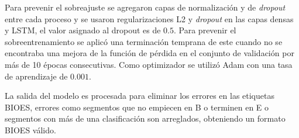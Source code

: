 \documentclass[a4paper,11pt,twocolumn,twoside]{article}
\begin{document}
Para prevenir el sobreajuste se agregaron capas de normalización y de \textit{dropout} entre cada proceso y se usaron regularizaciones
L2 y \textit{dropout} en las capas densas y LSTM, el valor asignado al dropout es de $0.5$. 
Para prevenir el sobreentrenamiento se aplicó una 
terminación temprana de este cuando no se encontraba una mejora de la función de pérdida en el conjunto de validación
por más de 10 épocas consecutivas. Como optimizador se utilizó Adam con una tasa de aprendizaje de $0.001$.

La salida del modelo es procesada para eliminar los errores en las etiquetas BIOES, errores como segmentos 
que no empiecen en B o terminen en E o segmentos con más de una clasificación son arreglados, 
obteniendo un formato BIOES válido.


\end{document}
